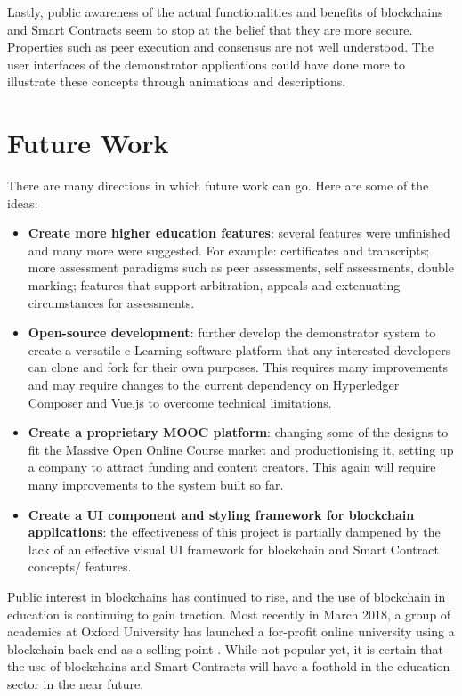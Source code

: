 Lastly, public awareness of the actual functionalities and benefits of blockchains 
and Smart Contracts seem to stop at the belief that they are more secure. Properties 
such as peer execution and consensus are not well understood. The user interfaces of 
the demonstrator applications could have done more to illustrate these concepts 
through animations and descriptions.

\section{Future Work}

There are many directions in which future work can go. Here are some of the ideas:

\begin{itemize}
    \item \textbf{Create more higher education features}: 
    several features were unfinished and many more were suggested. For example: 
    certificates and transcripts; more assessment paradigms such as peer assessments, 
    self assessments, double marking; features that support arbitration, 
    appeals and extenuating circumstances for assessments.
    \item \textbf{Open-source development}:
    further develop the demonstrator system to create a versatile e-Learning software 
    platform that any interested developers can clone and fork for their own purposes. 
    This requires many improvements and may require changes to the current dependency on 
    Hyperledger Composer and Vue.js to overcome technical limitations.
    \item \textbf{Create a proprietary MOOC platform}:
    changing some of the designs to fit the Massive Open Online Course market 
    and productionising it, setting up a company to attract funding and content creators. 
    This again will require many improvements to the system built so far.
    \item \textbf{Create a UI component and styling framework for blockchain applications}:
    the effectiveness of this project is partially dampened by the lack of 
    an effective visual UI framework for blockchain and Smart Contract concepts/ features.
\end{itemize}

Public interest in blockchains has continued to rise, and the use of blockchain in education is continuing 
to gain traction. Most recently in March 2018, a group of academics at Oxford University has launched 
a for-profit online university using a blockchain back-end as a selling point \citep{pells2018blockchainuni}. 
While not popular yet, it is certain that the use of blockchains and Smart Contracts will 
have a foothold in the education sector in the near future.


